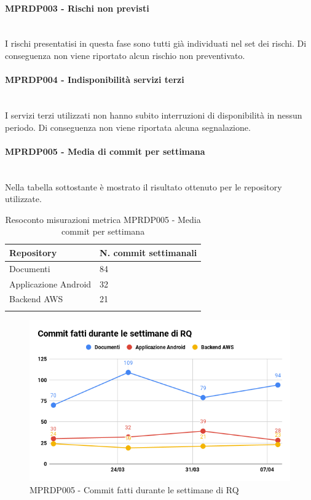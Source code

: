 \paragraph{MPRDP003 - Rischi non previsti}\mbox{}\\[0.4cm]
I rischi presentatisi in questa fase sono tutti già individuati nel set dei rischi. Di conseguenza non viene riportato alcun rischio non preventivato.
\paragraph{MPRDP004 - Indisponibilità servizi terzi}\mbox{}\\[0.4cm]
I servizi terzi utilizzati non hanno subito interruzioni di disponibilità in nessun periodo. Di conseguenza non viene riportata alcuna segnalazione.
\paragraph{MPRDP005 - Media di commit per settimana}\mbox{}\\[0.4cm]
Nella tabella sottostante è mostrato il risultato ottenuto per le repository utilizzate.
\begin{center}%
	\centering
	\renewcommand{\arraystretch}{1.5}
	\begin{longtable}{  p{5cm}  p{5cm} }
		\rowcolor{tableHeadYellow}
		\textbf{Repository}   & \textbf{N. commit settimanali} \\ 
		\endhead
		Documenti    			   & 84 \\
		Applicazione Android  & 32 \\
		Backend AWS    & 21          \\
		\rowcolor{white}
		\caption{Resoconto misurazioni metrica MPRDP005 - Media commit per settimana}
	\end{longtable}
\end{center}
\begin{figure}[H]
	\centering
	\includegraphics[width=13cm,keepaspectratio]{../includes/pics/Commit_RQ.png}
	\caption{\label{fig:mission}MPRDP005 - Commit fatti durante le settimane di RQ}
\end{figure}
